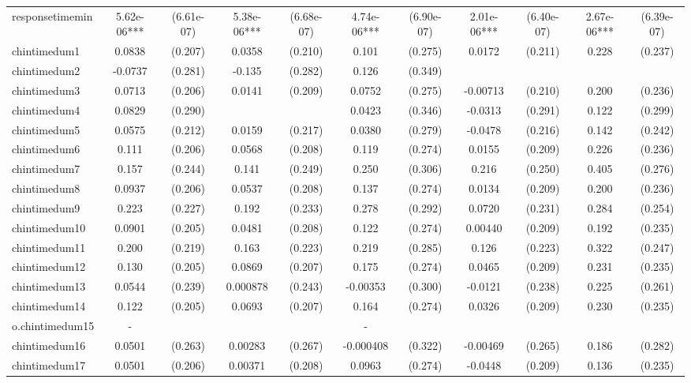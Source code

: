 \documentclass[]{article}
\begin{document}
\begin{tabular}{lcccccccccc}
responsetimemin & 5.62e-06*** & (6.61e-07) & 5.38e-06*** & (6.68e-07) & 4.74e-06*** & (6.90e-07) & 2.01e-06*** & (6.40e-07) & 2.67e-06*** & (6.39e-07) \\
chintimedum1 & 0.0838 & (0.207) & 0.0358 & (0.210) & 0.101 & (0.275) & 0.0172 & (0.211) & 0.228 & (0.237) \\
chintimedum2 & -0.0737 & (0.281) & -0.135 & (0.282) & 0.126 & (0.349) &  &  &  &  \\
chintimedum3 & 0.0713 & (0.206) & 0.0141 & (0.209) & 0.0752 & (0.275) & -0.00713 & (0.210) & 0.200 & (0.236) \\
chintimedum4 & 0.0829 & (0.290) &  &  & 0.0423 & (0.346) & -0.0313 & (0.291) & 0.122 & (0.299) \\
chintimedum5 & 0.0575 & (0.212) & 0.0159 & (0.217) & 0.0380 & (0.279) & -0.0478 & (0.216) & 0.142 & (0.242) \\
chintimedum6 & 0.111 & (0.206) & 0.0568 & (0.208) & 0.119 & (0.274) & 0.0155 & (0.209) & 0.226 & (0.236) \\
chintimedum7 & 0.157 & (0.244) & 0.141 & (0.249) & 0.250 & (0.306) & 0.216 & (0.250) & 0.405 & (0.276) \\
chintimedum8 & 0.0937 & (0.206) & 0.0537 & (0.208) & 0.137 & (0.274) & 0.0134 & (0.209) & 0.200 & (0.236) \\
chintimedum9 & 0.223 & (0.227) & 0.192 & (0.233) & 0.278 & (0.292) & 0.0720 & (0.231) & 0.284 & (0.254) \\
chintimedum10 & 0.0901 & (0.205) & 0.0481 & (0.208) & 0.122 & (0.274) & 0.00440 & (0.209) & 0.192 & (0.235) \\
chintimedum11 & 0.200 & (0.219) & 0.163 & (0.223) & 0.219 & (0.285) & 0.126 & (0.223) & 0.322 & (0.247) \\
chintimedum12 & 0.130 & (0.205) & 0.0869 & (0.207) & 0.175 & (0.274) & 0.0465 & (0.209) & 0.231 & (0.235) \\
chintimedum13 & 0.0544 & (0.239) & 0.000878 & (0.243) & -0.00353 & (0.300) & -0.0121 & (0.238) & 0.225 & (0.261) \\
chintimedum14 & 0.122 & (0.205) & 0.0693 & (0.207) & 0.164 & (0.274) & 0.0326 & (0.209) & 0.230 & (0.235) \\
o.chintimedum15 & - &  &  &  & - &  &  &  &  &  \\
chintimedum16 & 0.0501 & (0.263) & 0.00283 & (0.267) & -0.000408 & (0.322) & -0.00469 & (0.265) & 0.186 & (0.282) \\
chintimedum17 & 0.0501 & (0.206) & 0.00371 & (0.208) & 0.0963 & (0.274) & -0.0448 & (0.209) & 0.136 & (0.235) \\

\end{tabular}
\end{document}
